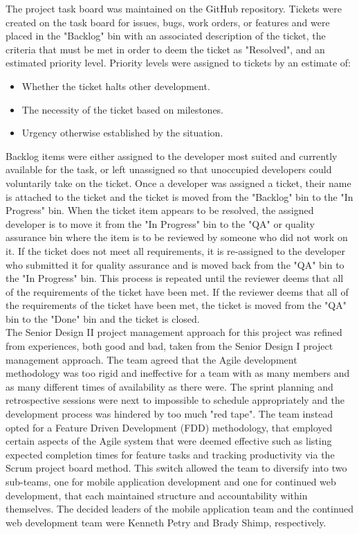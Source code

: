 The project task board was maintained on the GitHub repository.  
Tickets were created on the task board for issues, bugs, work orders, or features and were placed in the "Backlog" bin with an associated description of the ticket, the criteria that must be met in order to deem the ticket as "Resolved", and an estimated priority level. 
Priority levels were assigned to tickets by an estimate of:
\begin{itemize}
    \item Whether the ticket halts other development.
    \item The necessity of the ticket based on milestones. 
    \item Urgency otherwise established by the situation.
\end{itemize}

Backlog items were either assigned to the developer most suited and currently available for the task, or left unassigned so that unoccupied developers could voluntarily take on the ticket.  Once a developer was assigned a ticket, their name is attached to the ticket and the ticket is moved from the "Backlog" bin to the "In Progress" bin.  When the ticket item appears to be resolved, the assigned developer is to move it from the "In Progress" bin to the "QA" or quality assurance bin where the item is to be reviewed by someone who did not work on it.  If the ticket does not meet all requirements, it is re-assigned to the developer who submitted it for quality assurance and is moved back from the "QA" bin to the "In Progress" bin. This process is repeated until the reviewer deems that all of the requirements of the ticket have been met.  If the reviewer deems that all of the requirements of the ticket have been met, the ticket is moved from the "QA" bin to the "Done" bin and the ticket is closed.\\

The Senior Design II project management approach for this project was refined from experiences, both good and bad, taken from the Senior Design I project management approach.  The team agreed that the Agile development methodology was too rigid and ineffective for a team with as many members and as many different times of availability as there were.  The sprint planning and retrospective sessions were next to impossible to schedule appropriately and the development process was hindered by too much "red tape". The team instead opted for a Feature Driven Development (FDD) methodology, that employed certain aspects of the Agile system that were deemed effective such as listing expected completion times for feature tasks and tracking productivity via the Scrum project board method. This switch allowed the team to diversify into two sub-teams, one for mobile application development and one for continued web development, that each maintained structure and accountability within themselves.  The decided leaders of the mobile application team and the continued web development team were Kenneth Petry and Brady Shimp, respectively.\\

